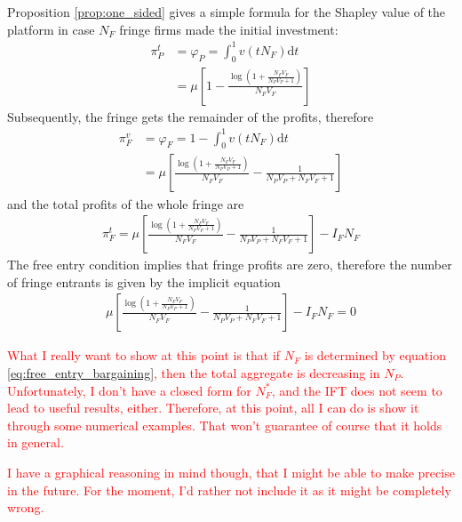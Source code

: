 \documentclass[a4paper]{article}
\newcommand{\dt}{\mathrm{d}t}
\begin{document}
Proposition \ref{prop:one_sided} gives a simple formula for the Shapley value of the platform in case $N_F$ fringe firms made the initial investment:
\begin{align*}
    \pi^t_P &= \varphi_P = \int_0^1 v(tN_F) \dt \\
            &= \mu \left[ 1 - \frac{\log \left(1 + \frac{N_F V_F}{N_P V_P + 1} \right)}{N_F V_F} \right]
\end{align*}
Subsequently, the fringe gets the remainder of the profits, therefore
\begin{align}
    \pi^v_F &= \varphi_F =  1 - \int_0^1 v(tN_F) \dt \\
            &= \mu \left[ \frac{\log \left( 1 + \frac{N_F V_F}{N_P V_P + 1} \right)}{N_F V_F} - \frac{1}{N_P V_P + N_F V_F + 1} \right]
            \label{eq:fringe_variable_profit}
\end{align}
and the total profits of the whole fringe are
\begin{align*}
    \pi^t_F = \mu \left[ \frac{\log \left( 1 + \frac{N_F V_F}{N_P V_P + 1} \right)}{N_F V_F} - \frac{1}{N_P V_P + N_F V_F + 1} \right] - I_F N_F
\end{align*}
The free entry condition implies that fringe profits are zero, therefore the number of fringe entrants is given by the implicit equation
\begin{align}
    \mu \left[ \frac{\log \left( 1 + \frac{N_F V_F}{N_P V_P + 1} \right)}{N_F V_F} - \frac{1}{N_P V_P + N_F V_F + 1} \right] - I_F N_F = 0
    \label{eq:free_entry_bargaining}
\end{align}

\textcolor{red}{
    What I really want to show at this point is that if $N_F$ is determined by equation \eqref{eq:free_entry_bargaining}, then the total aggregate is decreasing in $N_P$.
    Unfortunately, I don't have a closed form for $N_F^*$, and the IFT does not seem to lead to useful results, either.
    Therefore, at this point, all I can do is show it through some numerical examples.
    That won't guarantee of course that it holds in general.
}

\textcolor{red}{
    I have a graphical reasoning in mind though, that I might be able to make precise in the future.
    For the moment, I'd rather not include it as it might be completely wrong.
}

\end{document}
